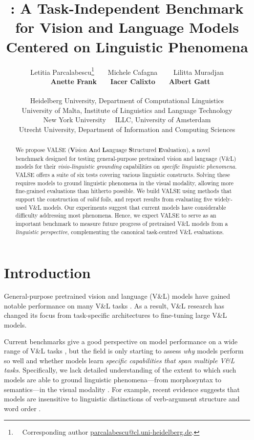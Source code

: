 \documentclass[11pt]{article}
\title{\dataset{} \dancer: A Task-Independent Benchmark for Vision and Language Models Centered on Linguistic Phenomena}
\author{Letitia Parcalabescu\thanks{~~Corresponding author \url{parcalabescu@cl.uni-heidelberg.de}.}\ \ ~~Michele Cafagna \ \ ~~Lilitta Muradjan \\ ~~\textbf{Anette Frank}\ \ ~~\textbf{Iacer Calixto}\ \ ~~\textbf{Albert Gatt} \\\\
Heidelberg University, Department of Computational Linguistics\\ 
University of Malta, Institute of Linguistics and Language Technology \\
New York University \ \ 
ILLC, University of Amsterdam\\
Utrecht University, Department of Information and Computing Sciences}
\date{}
\newcommand{\dataset}{VALSE}
\begin{document}
\maketitle

\begin{abstract}
We propose \dataset{} (\textbf{V}ision \textbf{A}nd \textbf{L}anguage \textbf{S}tructured \textbf{E}valuation), a novel benchmark designed for 
testing general-purpose pretrained vision and language (V\&L) models for their {\em visio-linguistic grounding} capabilities on {\em specific linguistic phenomena}. 
\dataset{} 
offers a suite of six tests covering various 
linguistic constructs. Solving these 
requires models to ground linguistic phenomena in the visual modality, allowing more fine-grained evaluations than hitherto possible.
We build \dataset{} using methods that support the construction of \textit{valid}
foils, and report results from evaluating five widely-used V\&L models.
Our experiments suggest that current models have considerable difficulty addressing most phenomena.
Hence, we expect \dataset{} to serve as an important benchmark to measure future progress of pretrained V\&L models from a \textit{linguistic perspective}, complementing the canonical task-centred V\&L evaluations.
\end{abstract}


\section{Introduction}\label{sec:intro}
General-purpose pretrained vision and language (V\&L) models have gained notable performance on many V\&L tasks
\cite{lu2019vilbert,tan-bansal-2019-lxmert,li2019visualbert,chen2020uniter,Li-etal-2020unicodervl,Su2020VL-BERT}.
As a result, 
V\&L research has changed its focus
from task-specific
architectures 
to fine-tuning
large
V\&L models.


Current benchmarks give a good perspective on 
model performance on a wide range of 
V\&L tasks \citep{cao2020behind,lourie2021unicorn,li2021value}, but the field is only starting to assess \emph{why} models perform so well 
and whether models learn \emph{specific capabilities that span multiple V\&L tasks}. 
Specifically, we lack detailed understanding of the extent to which such models are able to ground 
linguistic phenomena---from
morphosyntax 
to semantics---in the visual modality \cite{Bernardi2021}. For example, recent evidence suggests that models are insensitive to linguistic distinctions 
of verb-argument structure \cite{Hendricks2021} and word order \cite{cirik-etal-2018-visual, akula-etal-2020-words}.
\end{document}
